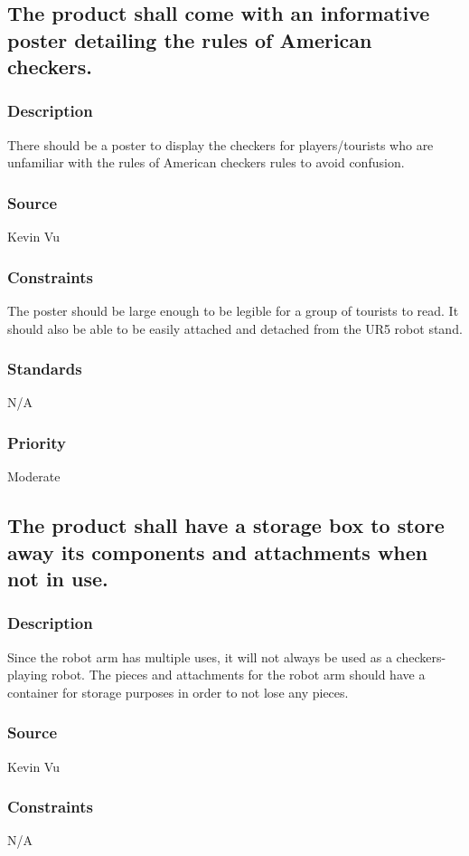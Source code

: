 \subsection{The product shall come with an informative poster detailing the rules of American checkers.}
\subsubsection{Description}
There should be a poster to display the checkers for players/tourists who are unfamiliar with the rules of American checkers rules to avoid confusion.
\subsubsection{Source}
Kevin Vu
\subsubsection{Constraints}
The poster should be large enough to be legible for a group of tourists to read. It should also be able to be easily attached and detached from the UR5 robot stand.
\subsubsection{Standards}
N/A
\subsubsection{Priority}
Moderate

\subsection{The product shall have a storage box to store away its components and attachments when not in use.}
\subsubsection{Description}
Since the robot arm has multiple uses, it will not always be used as a checkers-playing robot. The pieces and attachments for the robot arm should have a container for storage purposes in order to not lose any pieces.
\subsubsection{Source}
Kevin Vu
\subsubsection{Constraints}
N/A
